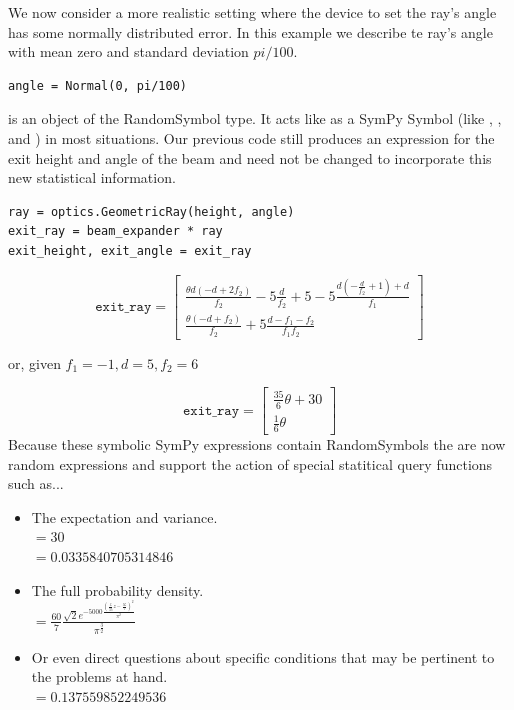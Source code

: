 We now consider a more realistic setting where the device to set the ray's angle has some normally distributed error. In this example we describe te ray's angle with mean zero and standard deviation $pi/100$.

\begin{lstlisting}
angle = Normal(0, pi/100)
\end{lstlisting}

 is an object of the RandomSymbol type. It acts like as a SymPy Symbol (like , , and ) in most situations. Our previous code still produces an expression for the exit height and angle of the beam and need not be changed to incorporate this new statistical information.

\begin{lstlisting}
ray = optics.GeometricRay(height, angle)
exit_ray = beam_expander * ray
exit_height, exit_angle = exit_ray
\end{lstlisting}
$$ \texttt{exit\_ray} = \left[\begin{smallmatrix}\frac{\theta d \left(- d + 2 f_{2}\right)}{f_{2}} - 5 \frac{d}{f_{2}} + 5 - 5 \frac{d \left(- \frac{d}{f_{2}} + 1\right) + d}{f_{1}}\\\frac{\theta \left(- d + f_{2}\right)}{f_{2}} + 5 \frac{d - f_{1} - f_{2}}{f_{1} f_{2}}\end{smallmatrix}\right]$$

or, given $f_1=-1, d = 5, f_2 = 6$

$$ \texttt{exit\_ray} = \left[\begin{smallmatrix}\frac{35}{6} \theta + 30\\\frac{1}{6} \theta\end{smallmatrix}\right]$$ 
Because these symbolic SymPy expressions contain RandomSymbols the are now random expressions and support the action of special statitical query functions such as...
\begin{itemize}
\item The expectation and variance.  \\
\indent {} $ = 30 $\\
\indent {} $ = 0.0335840705314846$

\item The full probability density.\\ 
\indent {} $ = \frac{60}{7} \frac{\sqrt{2} e^{- 5000 \frac{\left(\frac{6}{35} z - \frac{36}{7}\right)^{2}}{\pi^{2}}}}{\pi^{\frac{3}{2}}}$

\item Or even direct questions about specific conditions that may be pertinent to the problems at hand. \\
\indent {} $ = 0.137559852249536$
\end{itemize}
